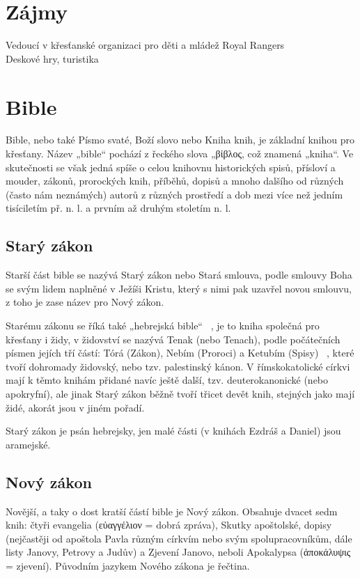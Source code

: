 \documentclass[letterpaper,12pt,oneside]{article}
\begin{document}
\section*{Zájmy}
Vedoucí v křesťanské organizaci pro děti a mládež Royal Rangers \\
Deskové hry, turistika
 

\newpage

\clearpage

\section{Bible}

Bible, nebo také Písmo svaté, Boží slovo nebo Kniha knih, je základní knihou pro křesťany. Název „bible“ pochází z řeckého slova „\textgreek{βἰβλος}, což znamená „kniha“. Ve skutečnosti se však jedná spíše o celou knihovnu historických spisů, přísloví a mouder, zákonů, prorockých knih, příběhů, dopisů a mnoho dalšího od různých (často nám neznámých) autorů z různých prostředí a dob mezi více než jedním tisíciletím př. n. l. a prvním až druhým stoletím n. l.

\subsection{Starý zákon}

Starší část bible se nazývá Starý zákon nebo Stará smlouva, podle smlouvy Boha se svým lidem naplněné v Ježíši Kristu, který s nimi pak uzavřel novou smlouvu, z toho je zase název pro Nový zákon.

Starému zákonu se říká také „hebrejská bible“ ~\cite{online-bible}, je to kniha společná pro křesťany i židy, v židovství se nazývá Tenak (nebo Tenach), podle počátečních písmen jejích tří částí: Tórá (Zákon), Nebím (Proroci) a Ketubím (Spisy) ~\cite[strana 17]{cep},  které tvoří dohromady židovský, nebo tzv. palestinský kánon. V římskokatolické církvi mají k těmto knihám přidané navíc ještě další, tzv. deuterokanonické (nebo apokryfní), ale jinak Starý zákon běžně tvoří třicet devět knih, stejných jako mají židé, akorát jsou v jiném pořadí.

Starý zákon je psán hebrejsky, jen malé části (v knihách Ezdráš a Daniel) jsou aramejské.

\subsection{Nový zákon}

Novější, a taky o dost kratší částí bible je Nový zákon. Obsahuje dvacet sedm knih: čtyři evangelia (\textgreek{εὐαγγέλιον} = dobrá zpráva), Skutky apoštolské, dopisy (nejčastěji od apoštola Pavla různým církvím nebo svým spolupracovníkům, dále listy Janovy, Petrovy a Judův) a Zjevení Janovo, neboli Apokalypsa (\textgreek{ἀποκάλυψις} = zjevení). Původním jazykem Nového zákona je řečtina.
\end{document}
